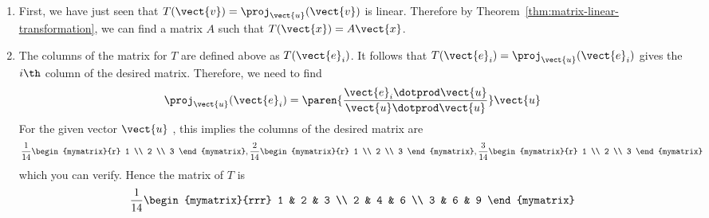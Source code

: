 \begin{solution}
\begin{enumerate}
\item
First, we have just seen that $T (\vect{v}) = \proj_{\vect{u}}(\vect{v})$ is linear. Therefore by Theorem~\ref{thm:matrix-linear-transformation}, we can find a matrix $A$ such that $T(\vect{x}) = A\vect{x}$.

\item
The columns of the matrix for $T$ are defined above as $T(\vect{e}_{i})$.
It follows that $T(\vect{e}_{i}) = \proj
_{\vect{u}}(\vect{e}_{i}) $ gives the $i\th$ column of the
desired matrix. Therefore, we need to find
\begin{equation*}
\proj_{\vect{u}}(\vect{e}_{i}) = \paren{\vspace{0.05in}
\frac{\vect{e}_{i}\dotprod \vect{u}}{\vect{u}\dotprod \vect{u}}}
\vect{u}
\end{equation*}
For the given vector $\vect{u}$ , this implies the columns of the desired
matrix are
\begin{equation*}
\vspace{0.05in}\frac{1}{14}\begin{mymatrix}{r}
1 \\
2 \\
3
\end{mymatrix} ,\vspace{0.05in}\frac{2}{14}\begin{mymatrix}{r}
1 \\
2 \\
3
\end{mymatrix} ,\vspace{0.05in}\frac{3}{14}\begin{mymatrix}{r}
1 \\
2 \\
3
\end{mymatrix}
\end{equation*}
which you can verify.
Hence the matrix of $T$ is
\begin{equation*}
\vspace{0.05in}\frac{1}{14}\begin{mymatrix}{rrr}
1 & 2 & 3 \\
2 & 4 & 6 \\
3 & 6 & 9
\end{mymatrix}
\end{equation*}
\end{enumerate}
\end{solution}
